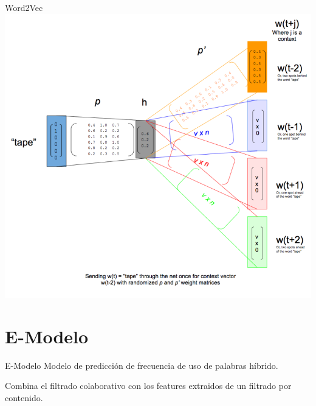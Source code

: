\documentclass[table]{beamer}
\begin{document}
  \begin{frame}{Word2Vec}
      \centering
      \includegraphics[scale=0.65]{./figures/skip-gram-exp.png}
  \end{frame}


  \section{E-Modelo}

  \begin{frame}{E-Modelo}
      Modelo de predicción de frecuencia de uso de palabras híbrido.

      Combina el filtrado colaborativo con los features extraidos de un filtrado por contenido.
  \end{frame}
\end{document}
